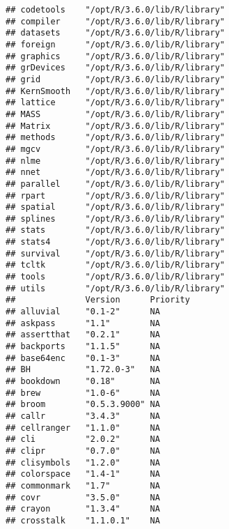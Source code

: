 \documentclass[]{book}
\begin{document}
\begin{verbatim}
## codetools    "/opt/R/3.6.0/lib/R/library"                          
## compiler     "/opt/R/3.6.0/lib/R/library"                          
## datasets     "/opt/R/3.6.0/lib/R/library"                          
## foreign      "/opt/R/3.6.0/lib/R/library"                          
## graphics     "/opt/R/3.6.0/lib/R/library"                          
## grDevices    "/opt/R/3.6.0/lib/R/library"                          
## grid         "/opt/R/3.6.0/lib/R/library"                          
## KernSmooth   "/opt/R/3.6.0/lib/R/library"                          
## lattice      "/opt/R/3.6.0/lib/R/library"                          
## MASS         "/opt/R/3.6.0/lib/R/library"                          
## Matrix       "/opt/R/3.6.0/lib/R/library"                          
## methods      "/opt/R/3.6.0/lib/R/library"                          
## mgcv         "/opt/R/3.6.0/lib/R/library"                          
## nlme         "/opt/R/3.6.0/lib/R/library"                          
## nnet         "/opt/R/3.6.0/lib/R/library"                          
## parallel     "/opt/R/3.6.0/lib/R/library"                          
## rpart        "/opt/R/3.6.0/lib/R/library"                          
## spatial      "/opt/R/3.6.0/lib/R/library"                          
## splines      "/opt/R/3.6.0/lib/R/library"                          
## stats        "/opt/R/3.6.0/lib/R/library"                          
## stats4       "/opt/R/3.6.0/lib/R/library"                          
## survival     "/opt/R/3.6.0/lib/R/library"                          
## tcltk        "/opt/R/3.6.0/lib/R/library"                          
## tools        "/opt/R/3.6.0/lib/R/library"                          
## utils        "/opt/R/3.6.0/lib/R/library"                          
##              Version      Priority     
## alluvial     "0.1-2"      NA           
## askpass      "1.1"        NA           
## assertthat   "0.2.1"      NA           
## backports    "1.1.5"      NA           
## base64enc    "0.1-3"      NA           
## BH           "1.72.0-3"   NA           
## bookdown     "0.18"       NA           
## brew         "1.0-6"      NA           
## broom        "0.5.3.9000" NA           
## callr        "3.4.3"      NA           
## cellranger   "1.1.0"      NA           
## cli          "2.0.2"      NA           
## clipr        "0.7.0"      NA           
## clisymbols   "1.2.0"      NA           
## colorspace   "1.4-1"      NA           
## commonmark   "1.7"        NA           
## covr         "3.5.0"      NA           
## crayon       "1.3.4"      NA           
## crosstalk    "1.1.0.1"    NA           

\end{verbatim}
\end{document}

